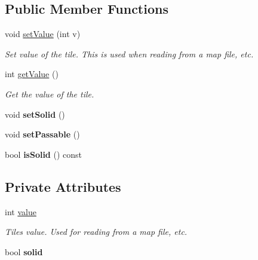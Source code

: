 \subsection*{Public Member Functions}
\begin{DoxyCompactItemize}
\item 
void \hyperlink{classTile_ae3d9e4ace265389dd0e0cf3d62ad6ff3}{set\+Value} (int v)\hypertarget{classTile_ae3d9e4ace265389dd0e0cf3d62ad6ff3}{}\label{classTile_ae3d9e4ace265389dd0e0cf3d62ad6ff3}

\begin{DoxyCompactList}\small\item\em Set value of the tile. This is used when reading from a map file, etc. \end{DoxyCompactList}\item 
int \hyperlink{classTile_aaab3d77d23e378c207ec50e6786052e0}{get\+Value} ()\hypertarget{classTile_aaab3d77d23e378c207ec50e6786052e0}{}\label{classTile_aaab3d77d23e378c207ec50e6786052e0}

\begin{DoxyCompactList}\small\item\em Get the value of the tile. \end{DoxyCompactList}\item 
void {\bfseries set\+Solid} ()\hypertarget{classTile_a3deac8e6d0ebd7b8352248201d264c38}{}\label{classTile_a3deac8e6d0ebd7b8352248201d264c38}

\item 
void {\bfseries set\+Passable} ()\hypertarget{classTile_a067099478c20b3f2fb56bc1c042a1e4e}{}\label{classTile_a067099478c20b3f2fb56bc1c042a1e4e}

\item 
bool {\bfseries is\+Solid} () const \hypertarget{classTile_a8e67a56637124f73f3da572178dd4838}{}\label{classTile_a8e67a56637124f73f3da572178dd4838}

\end{DoxyCompactItemize}
\subsection*{Private Attributes}
\begin{DoxyCompactItemize}
\item 
int \hyperlink{classTile_abc4813aabaaf0451b10bb45ed713bc7e}{value}\hypertarget{classTile_abc4813aabaaf0451b10bb45ed713bc7e}{}\label{classTile_abc4813aabaaf0451b10bb45ed713bc7e}

\begin{DoxyCompactList}\small\item\em Tiles value. Used for reading from a map file, etc. \end{DoxyCompactList}\item 
bool {\bfseries solid}\hypertarget{classTile_a9eec63370c6138ac19a5b48d1f32f855}{}\label{classTile_a9eec63370c6138ac19a5b48d1f32f855}

\end{DoxyCompactItemize}


